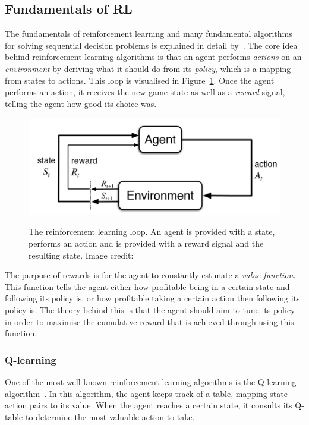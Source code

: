 \documentclass[12pt,a4paper]{article}
\begin{document}
    \subsection{Fundamentals of RL}\label{subsec:fundamentals}
    The fundamentals of reinforcement learning and many fundamental algorithms for solving sequential decision problems is explained in detail by~\citet{sutton18}.
    The core idea behind reinforcement learning algorithms is that an agent performs \emph{actions} on an \emph{environment} by deriving what it should do from its \emph{policy}, which is a mapping from states to actions.
    This loop is visualised in Figure~\ref{fig:rlgraph}.
    Once the agent performs an action, it receives the new game state as well as a \emph{reward} signal, telling the agent how good its choice was.

    \begin{figure}[ht]
        \caption[The reinforcement learning loop.]{The reinforcement learning loop. An agent is provided with a state, performs an action and is provided with a reward signal and the resulting state. Image credit: \citet{bhattrl}}
        \centering
        \includegraphics[scale=0.4]{rlgraph}
        \label{fig:rlgraph}
    \end{figure}

    The purpose of rewards is for the agent to constantly estimate a \emph{value function}.
    This function tells the agent either how profitable being in a certain state and following its policy is, or how profitable taking a certain action then following its policy is.
    The theory behind this is that the agent should aim to tune its policy in order to maximise the cumulative reward that is achieved through using this function.

    \subsubsection{Q-learning}
    One of the most well-known reinforcement learning algorithms is the Q-learning algorithm~\citep[chap.~6.5]{sutton18}.
    In this algorithm, the agent keeps track of a table, mapping state-action pairs to its value.
    When the agent reaches a certain state, it consults its Q-table to determine the most valuable action to take.
\end{document}
